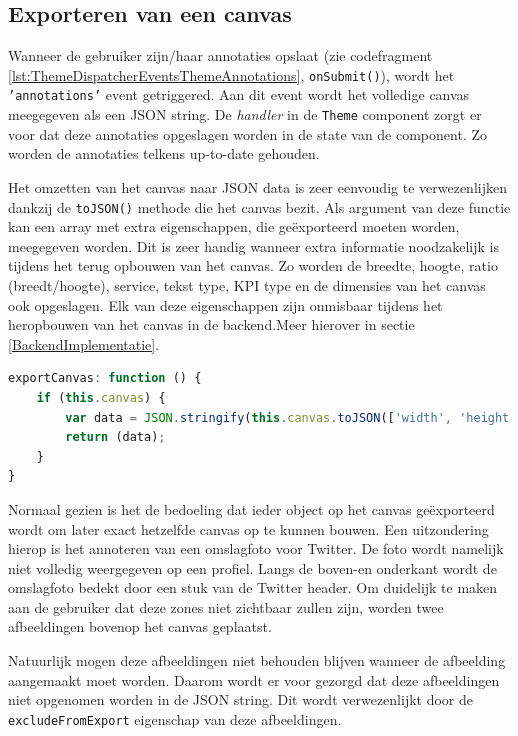 \subsection{Exporteren van een canvas}
Wanneer de gebruiker zijn/haar annotaties opslaat (zie codefragment \ref{lst:ThemeDispatcherEventsThemeAnnotations}, \texttt{onSubmit()}), wordt het \texttt{'annotations'} event getriggered. Aan dit event wordt het volledige canvas meegegeven als een JSON string. De \textit{handler} in de \texttt{Theme} component zorgt er voor dat deze annotaties opgeslagen worden in de state van de component. Zo worden de annotaties telkens up-to-date gehouden. 

Het omzetten van het canvas naar JSON data is zeer eenvoudig te verwezenlijken dankzij de \texttt{toJSON()} methode die het canvas bezit. Als argument van deze functie kan een array met extra eigenschappen, die ge\"{e}xporteerd moeten worden, meegegeven worden. Dit is zeer handig wanneer extra informatie noodzakelijk is tijdens het terug opbouwen van het canvas. Zo worden de breedte, hoogte, ratio (breedt/hoogte), service, tekst type, KPI type en de dimensies van het canvas ook opgeslagen. Elk van deze eigenschappen zijn onmisbaar tijdens het heropbouwen van het canvas in de backend.Meer hierover in sectie \ref{BackendImplementatie}. 

\begin{lstlisting}[caption={ThemeAnnotations component - exporteren van het canvas},label=lst:ThemeDispatcherEventsThemeAnnotations,language=javascript]
exportCanvas: function () {
	if (this.canvas) {
		var data = JSON.stringify(this.canvas.toJSON(['width', 'height', 'multiply', 'service', 'textType', 'kpiType', 'dimensions']));
		return (data);
	}
}
\end{lstlisting}

Normaal gezien is het de bedoeling dat ieder object op het canvas ge\"{e}xporteerd wordt om later exact hetzelfde canvas op te kunnen bouwen. Een uitzondering hierop is het annoteren van een omslagfoto voor Twitter. De foto wordt namelijk niet volledig weergegeven op een profiel. Langs de boven-en onderkant wordt de omslagfoto bedekt door een stuk van de Twitter header. Om duidelijk te maken aan de gebruiker dat deze zones niet zichtbaar zullen zijn, worden twee afbeeldingen bovenop het canvas geplaatst. 


Natuurlijk mogen deze afbeeldingen niet behouden blijven wanneer de afbeelding aangemaakt moet worden. Daarom wordt er voor gezorgd dat deze afbeeldingen niet opgenomen worden in de JSON string. Dit wordt verwezenlijkt door de \texttt{excludeFromExport} eigenschap van deze afbeeldingen.

